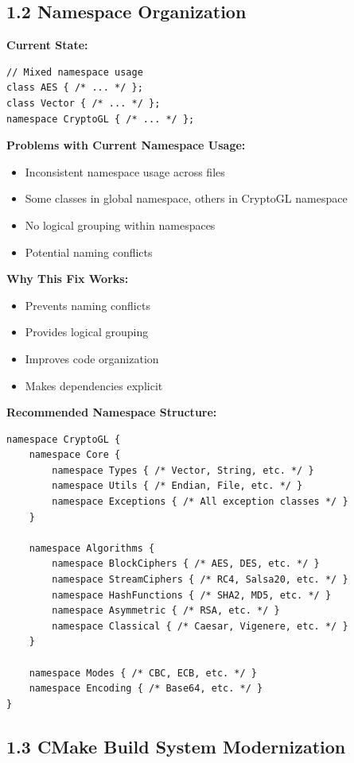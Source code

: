 \documentclass[11pt,a4paper]{article}
\begin{document}
\subsection{1.2 Namespace Organization}

\textbf{Current State:}
\begin{lstlisting}
// Mixed namespace usage
class AES { /* ... */ };
class Vector { /* ... */ };
namespace CryptoGL { /* ... */ };
\end{lstlisting}

\textcolor{problemred}{\textbf{Problems with Current Namespace Usage:}}
\begin{itemize}
    \item Inconsistent namespace usage across files
    \item Some classes in global namespace, others in CryptoGL namespace
    \item No logical grouping within namespaces
    \item Potential naming conflicts
\end{itemize}

\textcolor{solutiongreen}{\textbf{Why This Fix Works:}}
\begin{itemize}
    \item Prevents naming conflicts
    \item Provides logical grouping
    \item Improves code organization
    \item Makes dependencies explicit
\end{itemize}

\textbf{Recommended Namespace Structure:}
\begin{lstlisting}
namespace CryptoGL {
    namespace Core {
        namespace Types { /* Vector, String, etc. */ }
        namespace Utils { /* Endian, File, etc. */ }
        namespace Exceptions { /* All exception classes */ }
    }
    
    namespace Algorithms {
        namespace BlockCiphers { /* AES, DES, etc. */ }
        namespace StreamCiphers { /* RC4, Salsa20, etc. */ }
        namespace HashFunctions { /* SHA2, MD5, etc. */ }
        namespace Asymmetric { /* RSA, etc. */ }
        namespace Classical { /* Caesar, Vigenere, etc. */ }
    }
    
    namespace Modes { /* CBC, ECB, etc. */ }
    namespace Encoding { /* Base64, etc. */ }
}
\end{lstlisting}

\subsection{1.3 CMake Build System Modernization}
\end{document}

